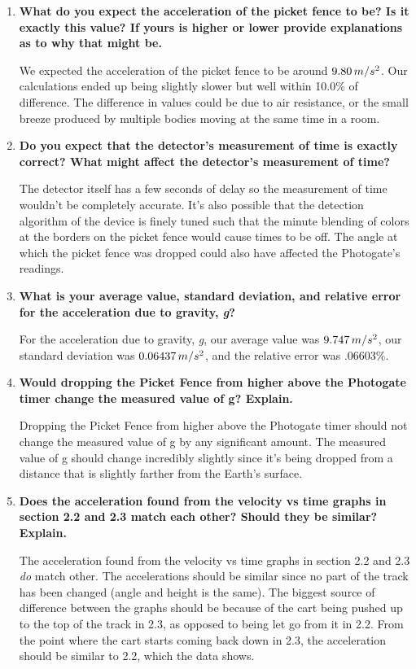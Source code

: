 \documentclass[a4paper,12pt]{article}
\begin{document}
\begin{enumerate}
	\item \textbf{What do you expect the acceleration of the picket fence to be? Is it exactly this value? If yours is higher or lower provide explanations as to why that might be.}

		We expected the acceleration of the picket fence to be around $9.80\thinspace{m/s^2}$. Our calculations ended up being slightly slower but well within 10.0\% of difference. The difference in values could be due to air resistance, or the small breeze produced by multiple bodies moving at the same time in a room.

	\item \textbf{Do you expect that the detector's measurement of time is exactly correct? What might affect the detector's measurement of time?}

	The detector itself has a few seconds of delay so the measurement of time wouldn't be completely accurate. It's also possible that the detection algorithm of the device is finely tuned such that the minute blending of colors at the borders on the picket fence would cause times to be off. The angle at which the picket fence was dropped could also have affected the Photogate's readings.

\item \textbf{What is your average value, standard deviation, and relative error for the acceleration due to gravity, \textit{g}?}

		For the acceleration due to gravity, \textit{g}, our average value was \textbf{$9.747\thinspace{m/s^2}$}, our standard deviation was \textbf{$0.06437\thinspace{m/s^2}$}, and the relative error was .06603\%.

\item \textbf{Would dropping the Picket Fence from higher above the Photogate timer change the measured value of g? Explain.}

	Dropping the Picket Fence from higher above the Photogate timer should not change the measured value of g by any significant amount. The measured value of g should change incredibly slightly since it's being dropped from a distance that is slightly farther from the Earth's surface.

\item \textbf{Does the acceleration found from the velocity vs time graphs in section 2.2 and 2.3 match each other? Should they be similar? Explain.}

	The acceleration found from the velocity vs time graphs in section 2.2 and 2.3 \textit{do} match other. The accelerations should be similar since no part of the track has been changed (angle and height is the same). The biggest source of difference between the graphs should be because of the cart being pushed up to the top of the track in 2.3, as opposed to being let go from it in 2.2. From the point where the cart starts coming back down in 2.3, the acceleration should be similar to 2.2, which the data shows. 


\end{enumerate}
\end{document}
